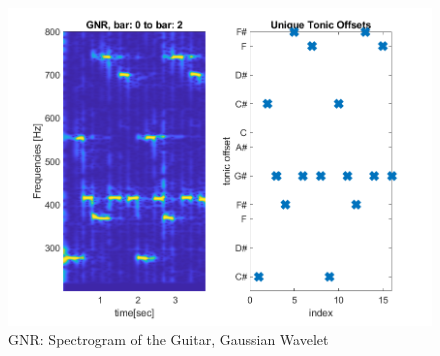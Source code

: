 \documentclass{article}
\begin{document}
        \begin{figure}[h]\label{fig:1}
            \includegraphics[width=12cm]{gnr-spectro.png}
            \centering
            \caption{GNR: Spectrogram of the Guitar, Gaussian Wavelet}
        \end{figure}
\end{document}
